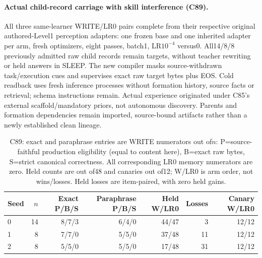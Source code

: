 \documentclass[11pt]{article}
\begin{document}
\paragraph{Actual child-record carriage with skill interference (C89).}
All three same-learner WRITE/LR0 pairs complete from their respective original
authored-Level1 perception adapters: one frozen base and one inherited adapter per arm, fresh
optimizers, eight passes, batch1, LR$10^{-4}$ versus0. All14/8/8 previously
admitted raw child records remain targets, without teacher rewriting or held
answers in SLEEP. The new compiler masks source-withdrawn task/execution cues
and supervises exact raw target bytes plus EOS. Cold readback uses fresh inference
processes without formation history, source facts or retrieval; schema instructions
remain. Actual experience originated under C85's external scaffold/mandatory
priors, not autonomous discovery. Parents and formation dependencies remain
imported, source-bound artifacts rather than a newly established clean lineage.
\begin{table}[htbp]
\centering\small
\begin{tabular}{lrrrrrr}
\toprule
Seed & $n$ & Exact P/B/S & Paraphrase P/B/S & Held W/LR0 & Losses & Canary W/LR0 \\
\midrule
0 & 14 & 8/7/3 & 6/4/0 & 44/47 & 3 & 12/12 \\
1 & 8 & 7/7/0 & 5/5/0 & 37/48 & 11 & 12/12 \\
2 & 8 & 5/5/0 & 5/5/0 & 17/48 & 31 & 12/12 \\
\bottomrule
\end{tabular}
\caption{C89: exact and paraphrase entries are WRITE numerators out of$n$:
P=source-faithful production eligibility (equal to content here), B=exact raw
bytes, S=strict canonical correctness. All corresponding LR0 memory numerators
are zero. Held counts are out of48 and canaries out of12; W/LR0 is arm order,
not wins/losses. Held losses are item-paired, with zero held gains.}
\label{tab:seq153-memory}
\end{table}
\end{document}
